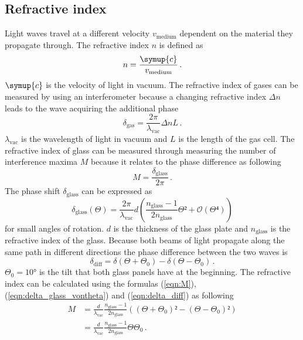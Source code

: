  \subsection{Refractive index}
 Light waves travel at a different velocity $v_{\text{medium}}$ dependent on the material they propagate through. 
 The refractive index $n$ is defined as 
 \begin{equation}
    n = \frac{\symup{c}}{v_{\text{medium}}} \label{n_generell} \, .
 \end{equation}
 $\symup{c}$ is the velocity of light in vacuum. 
 The refractive index of gases can be measured by using an interferometer because a changing refractive 
 index $\Delta n$ leads to the wave acquiring the additional phase 
 \begin{equation}
    \delta_{\text{gas}} = \frac{2 \pi}{\lambda_{\text{vac}}} \Delta n L \, . \label{eqn:delta_gas}
 \end{equation}
 $\lambda_{\text{vac}}$ is the wavelength of light in vacuum and $L$ is the length of the gas cell. 
 The refractive index of glass can be measured through measuring the number of interference maxima $M$
 because it relates to the phase difference as following 
 \begin{equation}
    M = \frac{\delta_{\text{glass}}}{2\pi} \label{eqn:M} \, .
 \end{equation}
 The phase shift $\delta_{\text{glass}}$ can be expressed as 
 \begin{equation}
    \delta_{\text{glass}}(\Theta) = \frac{2 \pi}{\lambda_{\text{vac}}} d \left( \frac{n_{\text{glass}}-1}{2n_{\text{glass}}} \Theta² + \mathcal{O}(\Theta⁴)\right) 
    \label{eqn:delta_glass_vontheta}
 \end{equation}
 for small angles of rotation. 
 $d$ is the thickness of the glass plate and $n_{\text{glass}}$ is the refractive index of the glass. 
 Because both beams of light propagate along the same path in different directions the phase difference between the two waves is 
 \begin{equation}
    \delta_{\text{diff}} = \delta(\Theta + \Theta_0) - \delta(\Theta - \Theta_0) \label{eqn:delta_diff} \, .
 \end{equation}
 $\Theta_0 = 10°$ is the tilt that both glass panels have at the beginning. The refractive index can be calculated using 
 the formulas (\ref{eqn:M}), (\ref{eqn:delta_glass_vontheta}) and (\ref{eqn:delta_diff}) as following 
 \begin{align*}
    M &= \frac{d}{\lambda_{\text{vac}}} \frac{n_{\text{glass}}-1}{2n_{\text{glass}}} \left( (\Theta + \Theta_0)² - (\Theta - \Theta_0)²\right) \\
    &= \frac{d}{\lambda_{\text{vac}}} \frac{n_{\text{glass}}-1}{2n_{\text{glass}}} \Theta \Theta_0    
    \, . 
 \end{align*}
